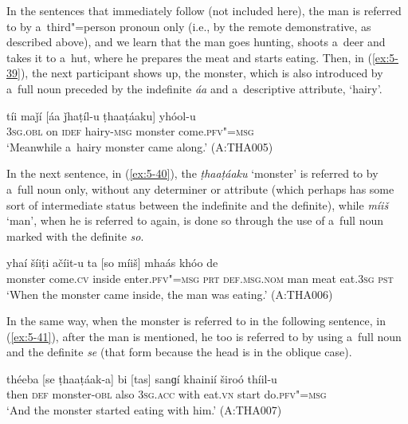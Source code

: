 In the sentences that immediately follow (not included here), the man is referred to by
a~third"=person pronoun only (i.e., by the remote demonstrative, as described above), and we learn
that the man goes hunting, shoots a~deer and takes it to a~hut, where he prepares the meat and
starts eating. Then, in (\ref{ex:5-39}), the next participant shows up, the monster, which is also
introduced by a~full noun preceded by the indefinite \textit{áa} and a~descriptive attribute,
`hairy'.
\begin{exe}
\ex
\label{ex:5-39}
\gll tíi maǰí [áa ǰhaṭíl-u ṭhaaṭáaku] yhóol-u\\
\textsc{3sg.obl} on \textsc{idef} hairy-\textsc{msg} monster come.\textsc{pfv"=msg}\\
\glt `Meanwhile a~hairy monster came along.' (A:THA005)
\end{exe}

In the next sentence, in (\ref{ex:5-40}), the \textit{ṭhaaṭáaku} `monster' is referred to by a~full noun
only, without any determiner or attribute (which perhaps has some sort of intermediate status
between the indefinite and the definite), while \textit{míiš} `man', when he is referred to
again, is done so through the use of a~full noun marked with the definite \textit{so}.
\begin{exe}
\ex
\label{ex:5-40}
\gll [ṭhaaṭáaku] yhaí šíiṭi ačíit-u ta [so míiš] mhaás khóo de\\
monster come.\textsc{cv} inside enter.\textsc{pfv"=msg} \textsc{prt} \textsc{def.msg.nom} man meat eat.\textsc{3sg} \textsc{pst}\\
\glt `When the monster came inside, the man was eating.' (A:THA006)
\end{exe}

In the same way, when the monster is referred to in the following sentence, in (\ref{ex:5-41}), after the man is mentioned, he too is referred to by using a~full noun and the definite \textit{se} (that form because the head is in the oblique case).
\begin{exe}
\ex
\label{ex:5-41}
\gll théeba [se ṭhaaṭáak-a] bi [tas] sanɡí khainií široó thíil-u\\
then \textsc{def} monster-\textsc{obl} also \textsc{3sg.acc} with eat.\textsc{vn} start do.\textsc{pfv"=msg}\\
\glt `And the monster started eating with him.' (A:THA007)
\end{exe}

